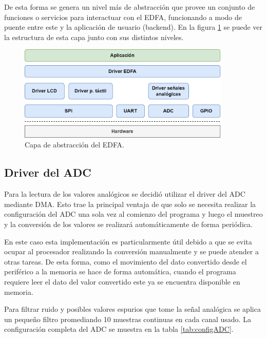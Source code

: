 De esta forma se genera un nivel más de abstracción que provee un conjunto de funciones o servicios para interactuar con el EDFA, funcionando a modo de puente entre este y la aplicación de usuario (backend). En la figura \ref{fig:halAmp} se puede ver la estructura de esta capa junto con sus distintos niveles.

\begin{figure}[H]
\centering
\includegraphics[width=0.9\textwidth]{./Figures/halamp2.png}
\caption{Capa de abstracción del EDFA.}
\label{fig:halAmp}
\end{figure}

\subsection{Driver del ADC}

Para la lectura de los valores analógicos se decidió utilizar el driver del ADC mediante DMA. Esto trae la principal ventaja de que solo se necesita realizar la configuración del ADC una sola vez al comienzo del programa y luego el muestreo y la conversión de los valores se realizará automáticamente de forma periódica.

En este caso esta implementación es particularmente útil debido a que se evita ocupar al procesador realizando la conversión manualmente y se puede atender a otras tareas. De esta forma, como el movimiento del dato convertido desde el periférico a la memoria se hace de forma automática, cuando el programa requiere leer el dato del valor convertido este ya se encuentra disponible en memoria.

Para filtrar ruido y posibles valores espurios que tome la señal analógica se aplica un pequeño filtro promediando 10 muestras continuas en cada canal usado. La configuración completa del ADC se muestra en la tabla \ref{tab:configADC}.

